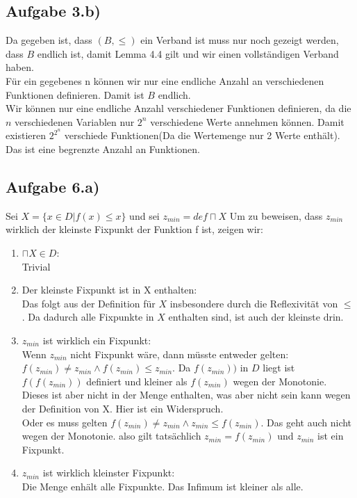 \documentclass[10pt,a4paper,german,landscape,fleqn]{article} \usepackage[utf8]{inputenc} %
\begin{document}
\subsection*{Aufgabe 3.b)}
Da gegeben ist, dass $(B,\le)$ ein Verband ist muss nur noch gezeigt werden, dass
$B$ endlich ist, damit Lemma 4.4 gilt und wir einen vollständigen Verband haben. \\
Für ein gegebenes n können wir nur eine endliche Anzahl an verschiedenen Funktionen definieren. Damit ist $B$ endlich. \\
Wir können nur eine endliche Anzahl verschiedener Funktionen definieren, da die $n$ verschiedenen Variablen nur $2^n$ verschiedene Werte annehmen können. Damit existieren $2^{2^n}$ verschiede Funktionen(Da die Wertemenge nur 2 Werte enthält). Das ist eine begrenzte Anzahl an Funktionen.

\subsection*{Aufgabe 6.a)}
Sei $X=\{x \in D | f(x) \le x \}$ und sei $z_{min} =def  \sqcap X$
Um zu beweisen, dass $z_{min}$ wirklich der kleinste Fixpunkt der Funktion f ist, zeigen wir:
\begin{enumerate}
  \item $\sqcap X \in D$: \\
    Trivial
  \item Der kleinste Fixpunkt ist in X enthalten: \\
    Das folgt aus der Definition für $X$ insbesondere durch die Reflexivität von $\le$. Da dadurch alle Fixpunkte in $X$ enthalten sind, ist auch der kleinste drin.
  \item $z_{min}$ ist wirklich ein Fixpunkt: \\
    Wenn $z_{min}$ nicht Fixpunkt wäre, dann müsste entweder gelten: $f(z_{min}) \neq z_{min} \wedge f(z_{min}) \le z_{min} $.
    Da $f(z_{min}))$ in $D$ liegt ist $f(f(z_{min}))$ definiert und kleiner als $f(z_{min})$ wegen der Monotonie. Dieses ist aber nicht in der Menge enthalten, was aber nicht sein kann wegen der Definition von X. Hier ist ein Widerspruch.\\
    Oder es muss gelten $f(z_{min}) \neq z_{min} \wedge z_{min} \le f(z_{min}) $. Das geht auch nicht wegen der Monotonie. also gilt tatsächlich $z_{min} = f(z_{min})$ und $z_{min}$ ist ein Fixpunkt.
  \item $z_{min}$ ist wirklich kleinster Fixpunkt: \\
    Die Menge enhält alle Fixpunkte. Das Infimum ist kleiner als alle.

\end{enumerate}
\end{document}
